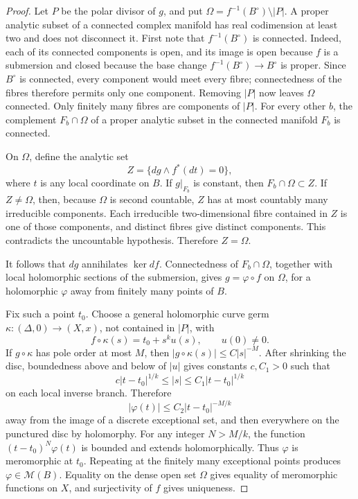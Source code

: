 \begin{proof}
Let \(P\) be the polar divisor of \(g\), and put
\(\Omega=f^{-1}(B^\circ)\setminus|P|\).  A proper analytic subset of a
connected complex manifold has real codimension at least two and does not
disconnect it.  First note that \(f^{-1}(B^\circ)\) is connected.  Indeed,
each of its connected components is open, and its image is open because
\(f\) is a submersion and closed because the base change
\(f^{-1}(B^\circ)\to B^\circ\) is proper.  Since \(B^\circ\) is connected,
every component would meet every fibre; connectedness of the fibres
therefore permits only one component.  Removing \(|P|\) now leaves
\(\Omega\) connected.  Only finitely many fibres are
components of \(|P|\).  For every other \(b\), the complement
\(F_b\cap\Omega\) of a proper analytic subset in the connected manifold
\(F_b\) is connected.

On \(\Omega\), define the analytic set
\[
 Z=\{dg\wedge f^*(dt)=0\},
\]
where \(t\) is any local coordinate on \(B\).  If \(g|_{F_b}\) is
constant, then \(F_b\cap\Omega\subset Z\).  If \(Z\ne\Omega\), then, because
\(\Omega\) is second countable, \(Z\) has at most countably many
irreducible components.  Each irreducible two-dimensional fibre contained
in \(Z\) is one of those components, and distinct fibres give distinct
components.  This contradicts the uncountable hypothesis.  Therefore
\(Z=\Omega\).

It follows that \(dg\) annihilates \(\ker df\).  Connectedness of
\(F_b\cap\Omega\), together with local holomorphic sections of the
submersion, gives \(g=\varphi\circ f\) on \(\Omega\), for a holomorphic
\(\varphi\) away from finitely many points of \(B\).

Fix such a point \(t_0\).  Choose a general holomorphic curve germ
\(\kappa:(\Delta,0)\to(X,x)\), not contained in \(|P|\), with
\[
 f\circ\kappa(s)=t_0+s^ku(s),\qquad u(0)\ne0.
\]
If \(g\circ\kappa\) has pole order at most \(M\), then
\(|g\circ\kappa(s)|\le C|s|^{-M}\).  After shrinking the disc, boundedness
above and below of \(|u|\) gives constants \(c,C_1>0\) such that
\[
 c|t-t_0|^{1/k}\le |s|\le C_1|t-t_0|^{1/k}
\]
on each local inverse branch.  Therefore
\[
 |\varphi(t)|\le C_2|t-t_0|^{-M/k}
\]
away from the image of a discrete exceptional set, and then everywhere on
the punctured disc by holomorphy.  For any integer \(N>M/k\), the function
\((t-t_0)^N\varphi(t)\) is bounded and extends holomorphically.  Thus
\(\varphi\) is meromorphic at \(t_0\).  Repeating at the finitely many
exceptional points produces \(\varphi\in\mathcal M(B)\).  Equality on the
dense open set \(\Omega\) gives equality of meromorphic functions on \(X\),
and surjectivity of \(f\) gives uniqueness.
\end{proof}

